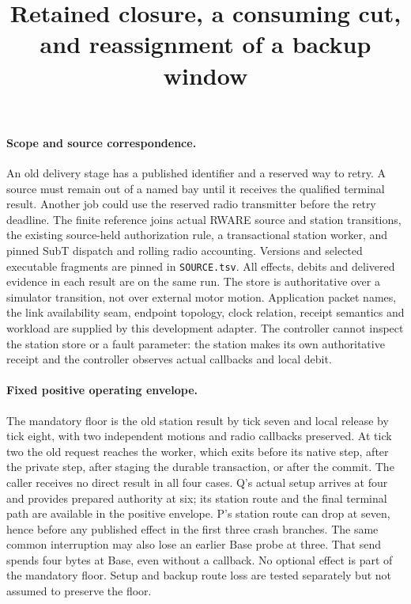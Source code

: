 \documentclass{article}
\title{Retained closure, a consuming cut, and reassignment of a backup window}
\date{}
\begin{document}
\maketitle

\paragraph{Scope and source correspondence.}
An old delivery stage has a published identifier and a reserved way
to retry. A source must remain out of a named bay until it receives
the qualified terminal result. Another job could use the reserved
radio transmitter before the retry deadline. The finite reference
joins actual RWARE source and station transitions, the existing
source-held authorization rule, a transactional station worker, and
pinned SubT dispatch and rolling radio accounting. Versions and
selected executable fragments are pinned in \verb|SOURCE.tsv|. All
effects, debits and delivered evidence in each result are on the
same run. The store is authoritative over a simulator transition,
not over external motor motion. Application packet names, the link
availability seam, endpoint topology, clock relation, receipt
semantics and workload are supplied by this development adapter.
The controller cannot inspect the station store or a fault parameter:
the station makes its own authoritative receipt and the controller
observes actual callbacks and local debit.

\paragraph{Fixed positive operating envelope.}
The mandatory floor is the old station result by tick seven and
local release by tick eight, with two independent motions and
radio callbacks preserved. At tick two the old request reaches the
worker, which exits before its native step, after the private step,
after staging the durable transaction, or after the commit. The
caller receives no direct result in all four cases. Q's actual
setup arrives at four and provides prepared authority at six; its
station route and the final terminal path are available in the
positive envelope. P's station route can drop at seven, hence
before any published effect in the first three crash branches.
The same common interruption may also lose an earlier Base probe
at three. That send spends four bytes at Base, even without a
callback. No optional effect is part of the mandatory floor.
Setup and backup route loss are tested separately but not assumed
to preserve the floor.
\end{document}
